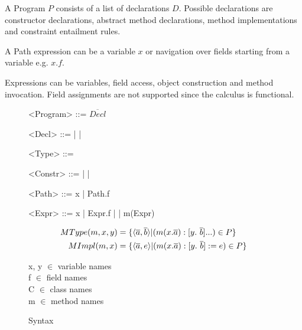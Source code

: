 A Program $P$ consists of a list of declarations $D$.
Possible declarations are constructor declarations,
abstract method declarations, method implementations and constraint entailment rules.

A Path expression can be a variable $x$ or navigation over fields starting from a variable e.g. $x.f$.

Expressions can be variables, field access, object construction and method invocation.
Field assignments are not supported since the calculus is functional.

\begin{figure}
\setlength{\grammarindent}{5em} %
\begin{grammar}
<Program>  ::= $\overline{Decl}$

<Decl> ::=  %
       | 
       \alt {} %
       |  %

<Type> ::= 

<Constr> ::=  %
           |  %
           |  %

<Path> ::= x
       | Path.f

<Expr> ::= x
       | Expr.f
       |  %
       | m(Expr)
\end{grammar}

\begin{align*}
MType(m, x, y) &= \{ \langle\overline{a}, \overline{b}\rangle | (m(x. \overline{a}): \type{y}{\ovl{b}}...) \in P \} \\ %
MImpl(m, x) &= \{\langle\overline{a}, e\rangle | (m(x. \overline{a}): \type{y}{\ovl{b}} := e) \in P \}
\end{align*}

x, y $\in$ variable names\\
f $\in$ field names\\
C $\in$ class names\\
m $\in$ method names
\caption{Syntax}
\label{fig:dcc-syntax}
\end{figure}

